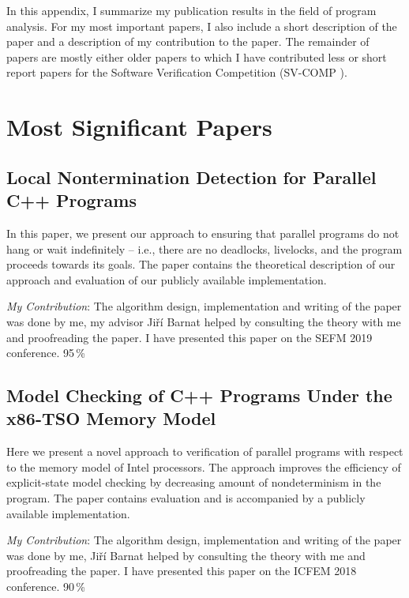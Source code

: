 In this appendix, I summarize my publication results in the field of program analysis.
For my most important papers, I also include a short description of the paper and a description of my contribution to the paper.
The remainder of papers are mostly either older papers to which I have contributed less or short report papers for the Software Verification Competition (SV-COMP ).

\section{Most Significant Papers}

\newcommand{\prc}[1]{\hfill{}#1\,\%}
\newcommand{\contrib}{\emph{My Contribution}:\xspace}

\subsection*{Local Nontermination Detection for Parallel C++ Programs}

In this paper, we present our approach to ensuring that parallel programs do not hang or wait indefinitely – i.e., there are no deadlocks, livelocks, and the program proceeds towards its goals.
The paper contains the theoretical description of our approach and evaluation of our publicly available implementation.

\contrib The algorithm design, implementation and writing of the paper was done by me, my advisor Jiří Barnat helped by consulting the theory with me and proofreading the paper.
I have presented this paper on the SEFM 2019 conference.
\prc{95}

\bigskip\noindent{}

\subsection*{Model Checking of C++ Programs Under the x86-TSO Memory Model}

Here we present a novel approach to verification of parallel programs with respect to the memory model of Intel processors.
The approach improves the efficiency of explicit-state model checking by decreasing amount of nondeterminism in the program.
The paper contains evaluation and is accompanied by a publicly available implementation.

\contrib The algorithm design, implementation and writing of the paper was done by me, Jiří Barnat helped by consulting the theory with me and proofreading the paper.
I have presented this paper on the ICFEM 2018 conference.
\prc{90}

